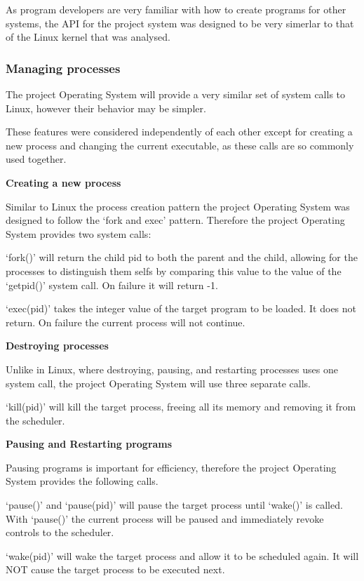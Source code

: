 \documentclass[a4paper]{report}
\begin{document}
As program developers are very familiar with how to create programs for other systems, the API for the project system was designed to be very simerlar to that of the Linux kernel that was analysed.

\subsubsection*{Managing processes}

The project Operating System will provide a very similar set of system calls to Linux, however their behavior may be simpler.

These features were considered independently of each other except for creating a new process and changing the current executable, as these calls are so commonly used together. 

\textbf{Creating a new process}

Similar to Linux the process creation pattern the project Operating System was designed to follow the `fork and exec' pattern. Therefore the project Operating System provides two system calls:

`fork()' will return the child pid to both the parent and the child, allowing for the processes to distinguish them selfs by comparing this value to the value of the `get\textunderscore pid()' system call. On failure it will return -1.

`exec(pid)' takes the integer value of the target program to be loaded. It does not return. On failure the current process will not continue.

\textbf{Destroying processes}

Unlike in Linux, where destroying, pausing, and restarting processes uses one system call, the project Operating System will use three separate calls.

`kill(pid)' will kill the target process, freeing all its memory and removing it from the scheduler.

\textbf{Pausing and Restarting programs}

Pausing programs is important for efficiency, therefore the project Operating System provides the following calls.

`pause()' and `pause(pid)' will pause the target process until `wake()' is called. With `pause()' the current process will be paused and immediately revoke controls to the scheduler.

`wake(pid)' will wake the target process and allow it to be scheduled again. It will NOT cause the target process to be executed next.
\end{document}
